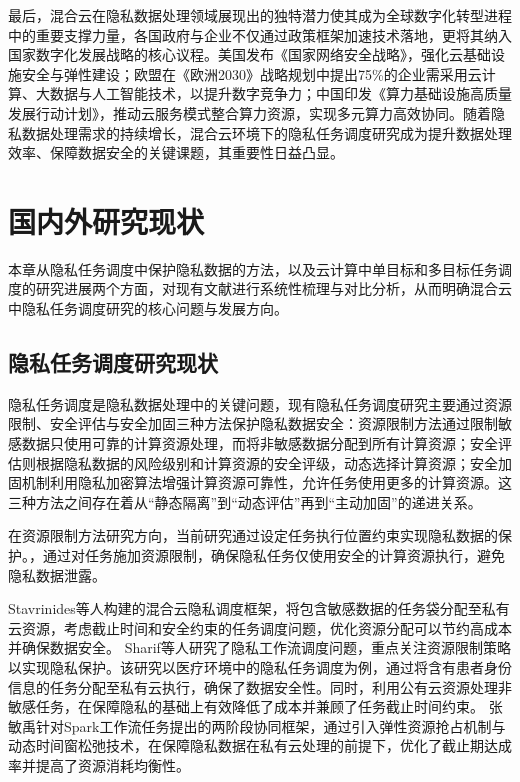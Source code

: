 最后，混合云在隐私数据处理领域展现出的独特潜力使其成为全球数字化转型进程中的重要支撑力量，各国政府与企业不仅通过政策框架加速技术落地，更将其纳入国家数字化发展战略的核心议程。美国发布《国家网络安全战略》，强化云基础设施安全与弹性建设；欧盟在《欧洲2030》战略规划中提出75\%的企业需采用云计算、大数据与人工智能技术，以提升数字竞争力；中国印发《算力基础设施高质量发展行动计划》，推动云服务模式整合算力资源，实现多元算力高效协同。随着隐私数据处理需求的持续增长，混合云环境下的隐私任务调度研究成为提升数据处理效率、保障数据安全的关键课题，其重要性日益凸显。

\section{国内外研究现状}\label{sec:related-works}

本章从隐私任务调度中保护隐私数据的方法，以及云计算中单目标和多目标任务调度的研究进展两个方面，对现有文献进行系统性梳理与对比分析，从而明确混合云中隐私任务调度研究的核心问题与发展方向。

\subsection{隐私任务调度研究现状}

隐私任务调度是隐私数据处理中的关键问题，现有隐私任务调度研究主要通过资源限制、安全评估与安全加固三种方法保护隐私数据安全\cite{hammoutiSecuredWorkflowScheduling2023}：资源限制方法通过限制敏感数据只使用可靠的计算资源处理，而将非敏感数据分配到所有计算资源；安全评估则根据隐私数据的风险级别和计算资源的安全评级，动态选择计算资源；安全加固机制利用隐私加密算法增强计算资源可靠性，允许任务使用更多的计算资源。这三种方法之间存在着从“静态隔离”到“动态评估”再到“主动加固”的递进关系。

在资源限制方法研究方向，当前研究通过设定任务执行位置约束实现隐私数据的保护。\cite{huangImprovedGeneticAlgorithm2023, sunEfficientEconomicalEnergysaving2023, leiPrivacySecurityawareWorkflow2022, wangSecurityawareTaskScheduling2021, sharifPrivacyAwareSchedulingSaaS2017, stavrinidesDynamicSchedulingBagsoftasks2021, wenSchedulingWorkflowsPrivacy2020, ZhangMinYuYigouhunheyunhuanjingxiadaiyinsixingyueshudeSparkrenwutiaodu2023,huangImprovedGeneticAlgorithm2023, budatiSecureMultiLevelPrivacyProtection2023}，通过对任务施加资源限制，确保隐私任务仅使用安全的计算资源执行，避免隐私数据泄露。

Stavrinides等人\cite{stavrinidesDynamicSchedulingBagsoftasks2021}构建的混合云隐私调度框架，将包含敏感数据的任务袋分配至私有云资源，考虑截止时间和安全约束的任务调度问题，优化资源分配可以节约高成本并确保数据安全。
Sharif等人\cite{sharifPrivacyAwareSchedulingSaaS2017}研究了隐私工作流调度问题，重点关注资源限制策略以实现隐私保护。该研究以医疗环境中的隐私任务调度为例，通过将含有患者身份信息的任务分配至私有云执行，确保了数据安全性。同时，利用公有云资源处理非敏感任务，在保障隐私的基础上有效降低了成本并兼顾了任务截止时间约束。
张敏禹\cite{ZhangMinYuYigouhunheyunhuanjingxiadaiyinsixingyueshudeSparkrenwutiaodu2023}针对Spark工作流任务提出的两阶段协同框架，通过引入弹性资源抢占机制与动态时间窗松弛技术，在保障隐私数据在私有云处理的前提下，优化了截止期达成率并提高了资源消耗均衡性。

